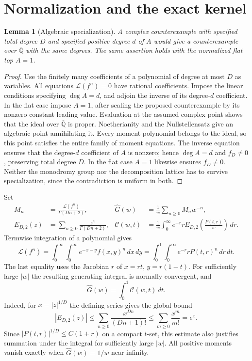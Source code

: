 \documentclass[11pt]{article}
\numberwithin{equation}{section}
\newtheorem{lemma}[theorem]{Lemma}
\theoremstyle{definition}\newtheorem{definition}[theorem]{Definition}
\theoremstyle{remark}\newtheorem{remark}[theorem]{Remark}
\newcommand{\Qb}{\overline{\mathbb Q}}
\newcommand{\Lfac}{\mathcal L}
\newcommand{\CC}{\mathcal C}
\newcommand{\HH}{\widehat G}
\newcommand{\dd}{\,d}
\begin{document}
\section{Normalization and the exact kernel}\label{sec:kernel}
\begin{lemma}[Algebraic specialization]\label{lem:specialization}
A complex counterexample with specified total degree $D$ and specified
positive degree $d$ of $A$ would give a counterexample over $\Qb$ with the
same degrees. The same assertion holds with the normalized flat top $A=1$.
\end{lemma}
\begin{proof}
Use the finitely many coefficients of a polynomial of degree at most $D$
as variables. All equations $\Lfac(f^n)=0$ have rational coefficients.
Impose the linear conditions specifying $\deg A=d$, and adjoin the inverse
of its degree-$d$ coefficient. In the flat case impose $A=1$, after
scaling the proposed counterexample by its nonzero constant leading value.
Evaluation at the assumed complex point shows that the ideal over
$\Qb$ is proper. Noetherianity and the Nullstellensatz give an algebraic
point annihilating it. Every moment polynomial belongs to the ideal, so
this point satisfies the entire family of moment equations. The inverse
equation ensures that the degree-$d$ coefficient of $A$ is nonzero;
hence $\deg A=d$ and $f_D\ne0$, preserving total degree $D$.
In the flat case $A=1$ likewise ensures $f_D\ne0$.
Neither the monodromy group nor the decomposition lattice has to survive
specialization, since the contradiction is uniform in both.
\end{proof}

Set
\begin{align}
 M_n&=\frac{\Lfac(f^n)}{\Gamma(Dn+2)}, &
 \HH(w)&=\frac1w\sum_{n\ge0}M_nw^{-n},\label{eq:normalized}\\
 E_{D,2}(z)&=\sum_{n\ge0}\frac{z^n}{\Gamma(Dn+2)}, &
 \CC(w,t)&=\frac1w\int_0^\infty e^{-r}r
 E_{D,2}\!\left(\frac{P(t,r)}w\right)\dd r.\label{eq:kernel}
\end{align}
Termwise integration of a polynomial gives
\[
 \Lfac(f^n)=\int_0^\infty\!\int_0^\infty e^{-x-y}f(x,y)^n\dd x\dd y
 =\int_0^1\!\int_0^\infty e^{-r}rP(t,r)^n\dd r\dd t.
\]
The last equality uses the Jacobian $r$ of $x=rt$, $y=r(1-t)$.
For sufficiently large $|w|$ the resulting generating integral is normally
convergent, and
\begin{equation}\label{eq:full-transform}
 \HH(w)=\int_0^1\CC(w,t)\dd t.
\end{equation}
Indeed, for $x=|z|^{1/D}$ the defining series gives the global bound
\begin{equation}\label{eq:ML-growth}
 |E_{D,2}(z)|\le\sum_{n\ge0}\frac{x^{Dn}}{(Dn+1)!}
 \le\sum_{m\ge0}\frac{x^m}{m!}=e^x.
\end{equation}
Since $|P(t,r)|^{1/D}\le C(1+r)$ on a compact $t$-set, this estimate
also justifies summation under the integral for sufficiently large $|w|$.
All positive moments vanish exactly when $\HH(w)=1/w$ near infinity.
\end{document}
